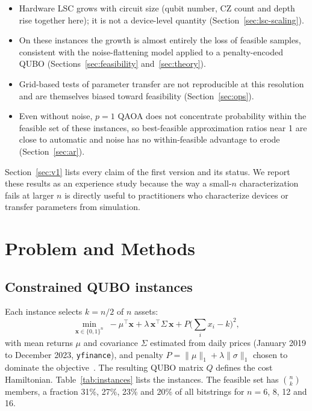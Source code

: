 \documentclass[conference]{IEEEtran}
\begin{document}
\begin{itemize}
  \item Hardware LSC grows with circuit size (qubit number, CZ count
        and depth rise together here); it is not a device-level quantity
        (Section~\ref{sec:lsc-scaling}).
  \item On these instances the growth is almost entirely the loss of
        feasible samples,
        consistent with the noise-flattening model applied to a
        penalty-encoded QUBO (Sections~\ref{sec:feasibility}
        and~\ref{sec:theory}).
  \item Grid-based tests of parameter transfer are not reproducible at
        this resolution and are themselves biased toward feasibility
        (Section~\ref{sec:ops}).
  \item Even without noise, $p{=}1$ QAOA does not concentrate probability
        within the feasible set of these instances, so best-feasible
        approximation ratios near 1 are close to automatic and noise has
        no within-feasible advantage to erode (Section~\ref{sec:ar}).
\end{itemize}

Section~\ref{sec:v1} lists every claim of the first version and its
status. We report these results as an experience study because the way
a small-$n$ characterization fails at larger $n$ is directly useful to
practitioners who characterize devices or transfer parameters from
simulation.

\section{Problem and Methods}
\label{sec:methods}

\subsection{Constrained QUBO instances}

Each instance selects $k{=}n/2$ of $n$ assets:
\begin{equation}
  \min_{\mathbf{x} \in \{0,1\}^n}\;
  -\mu^\top \mathbf{x} + \lambda\,\mathbf{x}^\top \Sigma\, \mathbf{x}
  + P \Big(\sum_{i} x_i - k\Big)^{2},
  \label{eq:qubo}
\end{equation}
with mean returns $\mu$ and covariance $\Sigma$ estimated from daily
prices (January 2019 to December 2023, \texttt{yfinance}), and penalty
$P = \|\mu\|_1 + \lambda\|\sigma\|_1$ chosen to dominate the
objective~\cite{glover2019quantum, lucas2014ising}. The resulting QUBO
matrix $Q$ defines the cost Hamiltonian. Table~\ref{tab:instances}
lists the instances. The feasible set has $\binom{n}{k}$ members, a
fraction 31\%, 27\%, 23\% and 20\% of all bitstrings for $n{=}6$, 8, 12
and 16.
\end{document}
